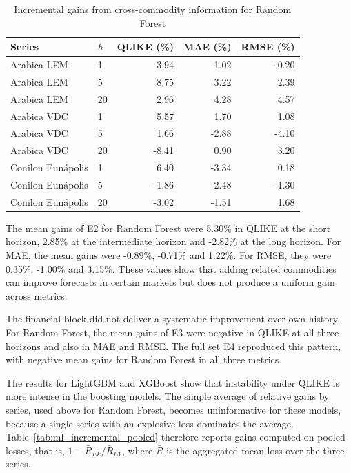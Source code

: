 \documentclass[a4paper,fleqn]{cas-sc}
\begin{document}
\begin{table}[t]
\centering
\caption{Incremental gains from cross-commodity information for Random Forest}
\label{tab:rf_incremental}
\scriptsize
\setlength{\tabcolsep}{2pt}
\begin{tabular}{@{}p{2.15cm}p{0.55cm}rrr@{}}
\hline
Series & \(h\) & QLIKE (\%) & MAE (\%) & RMSE (\%) \\
\hline
Arabica LEM & 1 & 3.94 & -1.02 & -0.20 \\
Arabica LEM & 5 & 8.75 & 3.22 & 2.39 \\
Arabica LEM & 20 & 2.96 & 4.28 & 4.57 \\
Arabica VDC & 1 & 5.57 & 1.70 & 1.08 \\
Arabica VDC & 5 & 1.66 & -2.88 & -4.10 \\
Arabica VDC & 20 & -8.41 & 0.90 & 3.20 \\
Conilon Eunápolis & 1 & 6.40 & -3.34 & 0.18 \\
Conilon Eunápolis & 5 & -1.86 & -2.48 & -1.30 \\
Conilon Eunápolis & 20 & -3.02 & -1.51 & 1.68 \\
\hline
\end{tabular}
\end{table}

The mean gains of E2 for Random Forest were 5.30\% in QLIKE at the short horizon, 2.85\% at the intermediate horizon and -2.82\% at the long horizon. For MAE, the mean gains were -0.89\%, -0.71\% and 1.22\%. For RMSE, they were 0.35\%, -1.00\% and 3.15\%. These values show that adding related commodities can improve forecasts in certain markets but does not produce a uniform gain across metrics.

The financial block did not deliver a systematic improvement over own history. For Random Forest, the mean gains of E3 were negative in QLIKE at all three horizons and also in MAE and RMSE. The full set E4 reproduced this pattern, with negative mean gains for Random Forest in all three metrics.

The results for LightGBM and XGBoost show that instability under QLIKE is more intense in the boosting models. The simple average of relative gains by series, used above for Random Forest, becomes uninformative for these models, because a single series with an explosive loss dominates the average. Table~\ref{tab:ml_incremental_pooled} therefore reports gains computed on pooled losses, that is, \(1-\bar R_{Ek}/\bar R_{E1}\), where \(\bar R\) is the aggregated mean loss over the three series.
\end{document}
